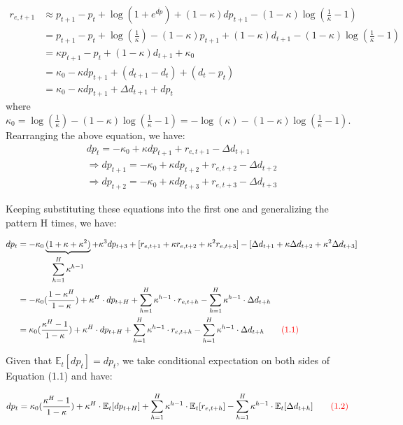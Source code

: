 \documentclass[11pt]{article}
\begin{document}
\[
\begin{aligned}
    r_{e,t+1} 
    &\approx p_{t+1} - p_t + \log(1+ e^{\overline{dp}}) + (1 - \kappa)dp_{t+1} -  (1 - \kappa)\log(\frac{1}{\kappa} - 1) \\
    &= p_{t+1} - p_t + \log(\frac{1}{\kappa}) -(1- \kappa)p_{t+1} + (1 -\kappa)d_{t+1} - (1 - \kappa)\log(\frac{1}{\kappa} - 1) \\
    &= \kappa p_{t+1} - p_t + (1- \kappa) d_{t+1} + \kappa_0 \\
    &= \kappa_0 -\kappa dp_{t+1} + (d_{t+1} - d_t) + (d_t- p_t) \\
    &= \kappa_0 - \kappa dp_{t+1} + \Delta d_{t+1} + dp_t 
\end{aligned}
\]
where $\kappa_0 = \log(\frac{1}{\kappa}) - (1 - \kappa)\log(\frac{1}{\kappa} - 1) = -\log(\kappa) - (1 - \kappa)\log(\frac{1}{\kappa} - 1)$. Rearranging the above equation, we have:
\[
\begin{aligned}
    dp_t = -\kappa_0 + \kappa dp_{t+1} + r_{e,t+1} - \Delta d_{t+1} \\
    \Rightarrow dp_{t+1} = -\kappa_0 + \kappa dp_{t+2} + r_{e,t+2} - \Delta d_{t+2} \\
    \Rightarrow dp_{t+2} = -\kappa_0 + \kappa dp_{t+3} + r_{e,t+3} - \Delta d_{t+3} 
\end{aligned}
\]

Keeping substituting these equations into the first one and generalizing the pattern H times, we have:


\begin{align}
    dp_t 
    &= -\kappa_0 \underbrace{(1+\kappa + \kappa^2)}_{\displaystyle \sum_{h=1}^{H} \kappa^{h-1}} + \kappa^3 dp_{t+3} + [r_{e,t+1} + \kappa r_{e,t+2} + \kappa^2 r_{e,t+3}] - [\Delta d_{t+1} + \kappa \Delta d_{t+2} + \kappa^2 \Delta d_{t+3}] \notag \\
    &= -\kappa_0 (\frac{1-\kappa^H}{1-\kappa}) + \kappa^H \cdot dp_{t+H} + \sum_{h=1}^{H} \kappa^{h-1} \cdot r_{e,t+h} - \sum_{h=1}^{H} \kappa^{h-1} \cdot \Delta d_{t+h} \notag \\
    &= \kappa_0 (\frac{\kappa^H-1}{1-\kappa}) + \kappa^H \cdot dp_{t+H} + \sum_{h=1}^{H} \kappa^{h-1} \cdot r_{e,t+h} - \sum_{h=1}^{H} \kappa^{h-1} \cdot \Delta d_{t+h}  \tag*{\color{red}(1.1)}
\end{align}

Given that $\mathbb{E}_t[dp_t] = dp_t$, we take conditional expectation on both sides of Equation {\color{red}(1.1)} and have:

\begin{align}
    dp_t
    &= \kappa_0 (\frac{\kappa^H-1}{1-\kappa}) + \kappa^H \cdot \mathbb{E}_t[dp_{t+H}] + \sum_{h=1}^{H} \kappa^{h-1} \cdot \mathbb{E}_t[r_{e,t+h}] - \sum_{h=1}^{H} \kappa^{h-1} \cdot \mathbb{E}_t[\Delta d_{t+h}]
    \tag*{\color{red}(1.2)}
\end{align}
\end{document}
